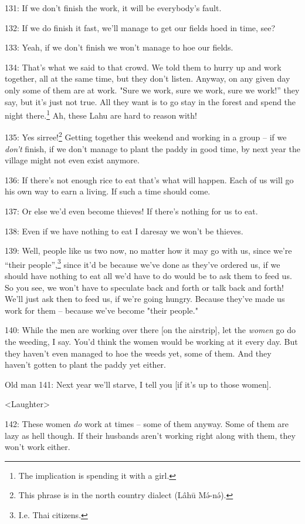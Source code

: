 131: If we don't finish the work, it will be everybody's fault.

132: If we do finish it fast, we'll manage to get our fields hoed in time, see?

133: Yeah, if we don't finish we won't manage to hoe our fields.

134: That's what we said to that crowd. We told them to hurry up and work together,
all at the same time, but they don't listen. Anyway, on any given day only some
of them are at work. "Sure we work, sure we work, sure we work!'' they
say, but it's just not true. All they want is to go stay in the forest and spend
the night there.\footnote{The implication is spending it with a girl.} Ah, these Lahu are hard to reason with!

135: Yes sirree!\footnote{This phrase is in the north country dialect (Lâhū Mə́-nə́).} Getting together this weekend and working in a group -- if
we\textit{ don't} finish, if we don't manage to plant the paddy in good time, by
next year the village might not even exist anymore.

136: If there's not enough rice to eat that's what will happen. Each of us will
go his own way to earn a living. If such a time should come.

137: Or else we'd even become thieves! If there's nothing for us to eat.

138: Even if we have nothing to eat I daresay we won't be thieves.

139: Well, people like us two now, no matter how it may go with us, since we're
``their people'',\footnote{I.e. Thai citizens.} since it'd be because we've done as they've ordered us, if
we should have nothing to eat all we'd have to do would be to ask them to feed
us. So you see, we won't have to speculate back and forth or talk back and forth!
We'll just ask then to feed us, if we're going hungry. Because they've made us
work for them -- because we've become "their people."

140: While the men are working over there [on the airstrip], let the \textit{women
}go do the weeding, I say. You'd think the women would be working at it every day.
But they haven't even managed to hoe the weeds yet, some of them. And they haven't
gotten to plant the paddy yet either.

Old man 141: Next year we'll starve, I tell you [if it's up to those women].

<Laughter>

142: These women \textit{do} work at times -- some of them anyway. Some of them
are lazy as hell though. If their husbands aren't working right along with them,
they won't work either.

